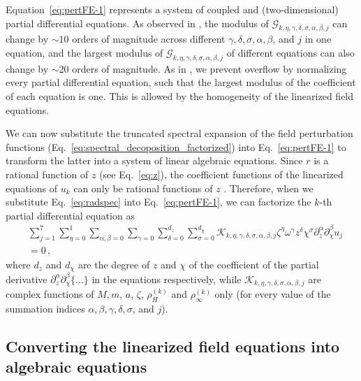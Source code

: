 \documentclass[aps,prx,amsmath,floats,floatfix,twocolumn,
  superscriptaddress,nofootinbib,showpacs]{revtex4-1}
\begin{document}
Equation~\eqref{eq:pertFE-1} represents a system of coupled and (two-dimensional) partial differential equations.  
As observed in \cite{Chung:2023wkd, Chung:2023zdq}, the modulus of $\mathcal{G}_{k, \eta, \gamma, \delta, \sigma, \alpha, \beta, j}$ can change by $\sim 10$ orders of magnitude across different $\gamma, \delta, \sigma, \alpha, \beta$, and $j$ in one equation, and the largest modulus of $\mathcal{G}_{k, \eta, \gamma, \delta, \sigma, \alpha, \beta, j}$ of different equations can also change by $\sim 20$ orders of magnitude. 
As in \cite{Chung:2023wkd, Chung:2023zdq}, we prevent overflow by normalizing every partial differential equation, such that the largest modulus of the coefficient of each equation is one. 
This is allowed by the homogeneity of the linearized field equations.

We can now substitute the truncated spectral expansion of the field perturbation functions (Eq.~\eqref{eq:spectral_decoposition_factorized}) into Eq.~\eqref{eq:pertFE-1} to transform the latter into a system of linear algebraic equations. 
Since $r$ is a rational function of $z$ (see Eq.~\eqref{eq:z}), the coefficient functions of the linearized equations of $u_k$ can only be rational functions of $z$ \cite{Chung:2023wkd}. 
Therefore, when we substitute Eq.~\eqref{eq:radspec} into Eq.~\eqref{eq:pertFE-1}, 
we can factorize the $k$-th partial differential equation as
\begin{equation}\label{eq:system_3}
\begin{split}
& \sum_{j=1}^{7} \sum_{\eta = 0}^{1} \sum_{\alpha, \beta = 0} \sum_{\gamma=0} \sum_{\delta=0}^{d_{z}} \sum_{\sigma=0}^{d_{\chi}} \mathcal{K}_{k, \eta, \gamma, \delta, \sigma, \alpha, \beta, j} \zeta^{\eta} \omega^\gamma z^{\delta} \chi^{\sigma} \partial_{z}^{\alpha} \partial_{\chi}^{\beta} u_j \\
& = 0 \,, 
\end{split}
\end{equation}
where $d_z$ and $d_{\chi}$ are the degree of $z$ and $\chi$ of the coefficient of the partial derivative $\partial_{z}^{\alpha} \partial_{\chi}^{\beta} \{...\} $ in the equations respectively, while $\mathcal{K}_{k, \eta, \gamma, \delta, \sigma, \alpha, \beta, j}$ are complex functions of $M, m$, $a$, $\zeta$, $\rho_H^{(k)}$ and $\rho_{\infty}^{(k)}$ only (for every value of the summation indices $ \alpha, \beta, \gamma, \delta, \sigma$, and $j$). 

\subsection{Converting the linearized field equations into algebraic equations}
\label{sec:Conversion}
\end{document}
